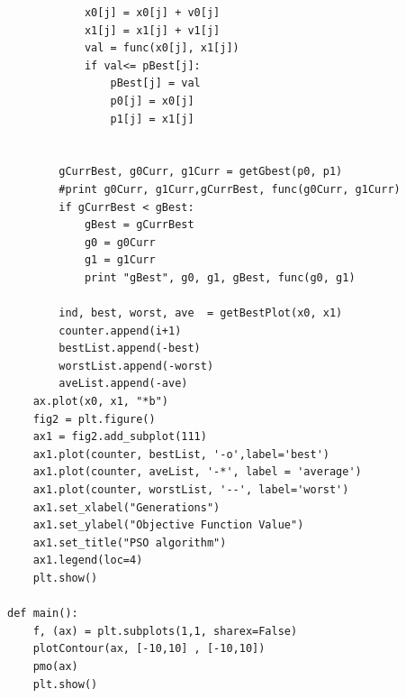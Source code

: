 \documentclass{article}
\begin{document}
\begin{lstlisting}
            x0[j] = x0[j] + v0[j]
            x1[j] = x1[j] + v1[j]
            val = func(x0[j], x1[j])
            if val<= pBest[j]:
                pBest[j] = val
                p0[j] = x0[j]
                p1[j] = x1[j]


        gCurrBest, g0Curr, g1Curr = getGbest(p0, p1)
        #print g0Curr, g1Curr,gCurrBest, func(g0Curr, g1Curr)
        if gCurrBest < gBest:
            gBest = gCurrBest
            g0 = g0Curr
            g1 = g1Curr
            print "gBest", g0, g1, gBest, func(g0, g1)

        ind, best, worst, ave  = getBestPlot(x0, x1)
        counter.append(i+1)
        bestList.append(-best)
        worstList.append(-worst)
        aveList.append(-ave)
    ax.plot(x0, x1, "*b")
    fig2 = plt.figure()
    ax1 = fig2.add_subplot(111)
    ax1.plot(counter, bestList, '-o',label='best')
    ax1.plot(counter, aveList, '-*', label = 'average')
    ax1.plot(counter, worstList, '--', label='worst')
    ax1.set_xlabel("Generations")
    ax1.set_ylabel("Objective Function Value")
    ax1.set_title("PSO algorithm")
    ax1.legend(loc=4)
    plt.show()

def main():
    f, (ax) = plt.subplots(1,1, sharex=False)
    plotContour(ax, [-10,10] , [-10,10])
    pmo(ax)
    plt.show()
\end{lstlisting} 
\end{document}
